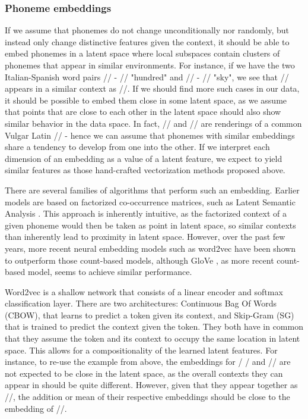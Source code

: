 \documentclass[6pt]{article}
\begin{document}
\subsubsection{Phoneme embeddings}
\label{Phoneme embeddings}



If we assume that phonemes do not change unconditionally nor randomly, but instead only change distinctive features given the context, it should be able to embed phonemes in a latent space where local subspaces contain clusters of phonemes that appear in similar environments. For instance, if we have the two Italian-Spanish word pairs // - // "hundred" and  // - // "sky", we see that // appears in a similar context as //. If we should find more such cases in our data, it should be possible to embed them close in some latent space, as we assume that points that are close to each other in the latent space should also show similar behavior in the data space. In fact, // and // are renderings of a common Vulgar Latin // - hence we can assume that phonemes with similar embeddings share a tendency to develop from one into the other. If we interpret each dimension of an embedding as a value of a latent feature, we expect to yield similar features as those hand-crafted vectorization methods proposed above.



There are several families of algorithms that perform such an embedding. Earlier models are based on factorized co-occurrence matrices, such as Latent Semantic Analysis \citep{landauer2013handbook}. This approach is inherently intuitive, as the factorized context of a given phoneme would then be taken as point in latent space, so similar contexts than inherently lead to proximity in latent space. However, over the past few years, more recent neural embedding models such as word2vec \citep{mikolov2013efficient,mikolov2013distributed,goldberg2014word2vec}  have been shown to outperform those count-based models, although GloVe \citep{pennington2014glove}, as more recent count-based model, seems to achieve similar performance.

Word2vec is a shallow network that consists of a linear encoder and softmax classification layer. There are two architectures: Continuous Bag Of Words (CBOW), that learns to predict a token given its context, and Skip-Gram (SG) that is trained to predict the context given the token. They both have in common that they assume the token and its context to occupy the same location in latent space. This allows for a compositionality of the learned latent features. For instance, to re-use the example from above, the embeddings for / / and // are not expected to be close in the latent space, as the overall contexts they can appear in should be quite different. However, given that they appear together as //, the addition or mean of their respective embeddings should be close to the embedding of //.
\end{document}
